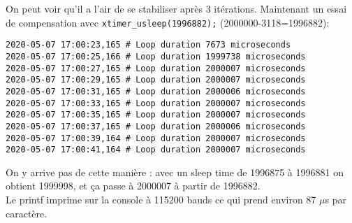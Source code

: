 On peut voir qu'il a l'air de se stabiliser après 3 itérations.
Maintenant un essai de compensation avec
\texttt{xtimer\_usleep(1996882);} (2000000-3118=1996882):
{\scriptsize
\begin{verbatim}
2020-05-07 17:00:23,165 # Loop duration 7673 microseconds
2020-05-07 17:00:25,166 # Loop duration 1999738 microseconds
2020-05-07 17:00:27,165 # Loop duration 2000007 microseconds
2020-05-07 17:00:29,165 # Loop duration 2000007 microseconds
2020-05-07 17:00:31,165 # Loop duration 2000006 microseconds
2020-05-07 17:00:33,165 # Loop duration 2000007 microseconds
2020-05-07 17:00:35,165 # Loop duration 2000007 microseconds
2020-05-07 17:00:37,165 # Loop duration 2000006 microseconds
2020-05-07 17:00:39,164 # Loop duration 2000007 microseconds
2020-05-07 17:00:41,164 # Loop duration 2000007 microseconds
\end{verbatim}
}

On y arrive pas de cette manière : avec un sleep time de 1996875
à 1996881 on obtient 1999998, et ça passe à 2000007 à partir de
1996882.\\

Le printf imprime sur la console à 115200 bauds ce qui prend environ
87 $\mu$s par caractère.\\


